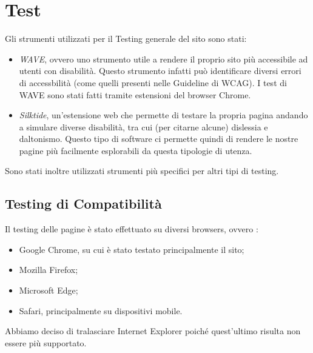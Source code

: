 \section{Test}

  Gli strumenti utilizzati per il Testing generale del sito sono stati:
  \begin{itemize}
    \item \textit{WAVE}, ovvero uno strumento utile a rendere il proprio sito più accessibile ad utenti con disabilità. Questo strumento infatti può identificare diversi errori di accessbilità (come quelli presenti nelle Guideline di WCAG). I test di WAVE sono stati fatti tramite estensioni del browser Chrome.
    \item \textit{Silktide}, un'estensione web che permette di testare la propria pagina andando a simulare diverse disabilità, tra cui (per citarne alcune) dislessia e daltonismo. Questo tipo di software ci permette quindi di rendere le nostre pagine più facilmente esplorabili da questa tipologie di utenza.
  \end{itemize}
  Sono stati inoltre utilizzati strumenti più specifici per altri tipi di testing.
	
  \subsection{Testing di Compatibilità}
    Il testing delle pagine è stato effettuato su diversi browsers, ovvero :
    \begin{itemize}
      \item Google Chrome, su cui è stato testato principalmente il sito;
      \item Mozilla Firefox;
      \item  Microsoft Edge;
      \item Safari, principalmente su dispositivi mobile.
    \end{itemize}
    Abbiamo deciso di tralasciare Internet Explorer poiché quest'ultimo risulta non essere più supportato.

